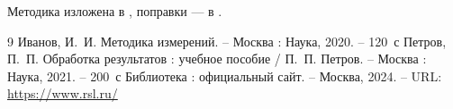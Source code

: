 Методика изложена в \cite{ivanov}, поправки — в \cite{petrov}.

\begin{thebibliography}{9}
   Иванов, И.~И. Методика измерений. – Москва : Наука, 2020. – 120~с %
   Петров, П.~П. Обработка результатов : учебное пособие /
  П.~П. Петров. – Москва : Наука, 2021. – 200~с %
   Библиотека : официальный сайт. – Москва, 2024. –
  URL: \url{https://www.rsl.ru/} %
\end{thebibliography}
